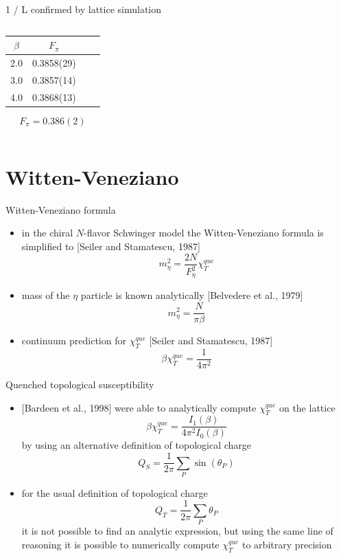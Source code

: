 \documentclass[english]{beamer}
\begin{document}
\begin{frame}{1 / L confirmed by lattice simulation}
\begin{columns}[t]
      \begin{center} 
	    \begin{tabular}{c c c c}
	      $\beta$ & $F_\pi$ \\
	      \hline
	      2.0 & 0.3858(29) \\
	      \hline
	      3.0 & 0.3857(14) \\
	      \hline
	      4.0 & 0.3868(13) \\
	    \end{tabular}
        \[
      	  F_\pi = 0.386(2)
        \]
      \end{center}	 
  \end{columns}
\end{frame}


\section{Witten-Veneziano}

\begin{frame}{Witten-Veneziano formula}
  \begin{itemize}
    \item in the chiral $N$-flavor Schwinger model the
      Witten-Veneziano formula is simplified to [Seiler and
      Stamatescu, 1987]
      \[
        m_\eta^2 = \frac{2N}{F_\eta^2}\chi_T^{que}
      \]
    \item mass of the $\eta$ particle is known analytically
      [Belvedere et al., 1979] 
      \[
        m_\eta^2 = \frac{N}{\pi\beta}
      \]
    \item continuum prediction for $\chi_T^{que}$
      [Seiler and Stamatescu, 1987]
      \[
        \beta\chi_T^{que} = \frac{1}{4\pi^2}
      \]
  \end{itemize}
\end{frame}

\begin{frame}{Quenched topological susceptibility}
  \begin{itemize}
    \item {[Bardeen et al., 1998]} were able to analytically
      compute $\chi_T^{que}$ on the lattice
      \[
        \beta\chi_T^{que} = \frac{I_1(\beta)}{4 \pi^2 I_0(\beta)}
      \]
      by using an alternative definition of topological charge
      \[
        Q_S = \frac{1}{2\pi}\sum_{P}\sin(\theta_P)
      \]
    \item for the usual definition of topological charge
      \[
        Q_T = \frac{1}{2\pi}\sum_{P}\theta_P
      \]
      it is not possible to find an analytic expression, but using the 
      same line of reasoning it is possible to numerically compute
      $\chi_T^{que}$ to arbitrary precision
  \end{itemize}
\end{frame}
\end{document}
